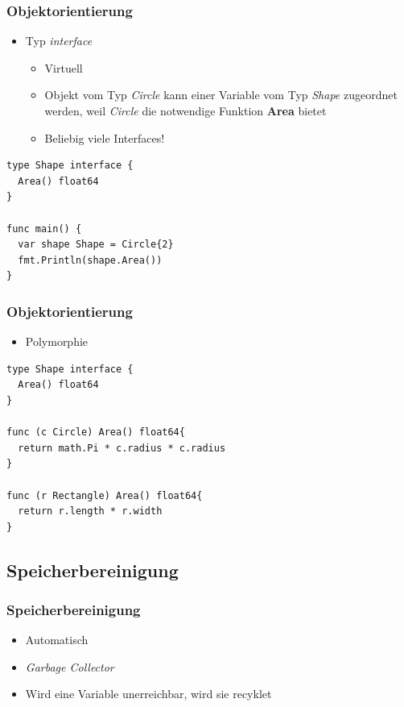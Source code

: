 \documentclass{beamer}
\begin{document}
\begin{frame}[fragile]
\frametitle{Objektorientierung}

\begin{itemize}
\item Typ \textit{interface}
\begin{itemize}
\setlength{\itemsep}{12pt}
\item Virtuell
\item Objekt vom Typ \textit{Circle} kann einer Variable vom Typ \textit{Shape} zugeordnet werden, weil \textit{Circle} die notwendige Funktion \textbf{Area} bietet
\item Beliebig viele Interfaces!
\end{itemize}
\end{itemize}

\begin{lstlisting}
type Shape interface {
  Area() float64
}

func main() {
  var shape Shape = Circle{2}
  fmt.Println(shape.Area())
}
\end{lstlisting}

\end{frame}

\begin{frame}[fragile]
\frametitle{Objektorientierung}

\begin{itemize}
\item Polymorphie
\end{itemize}

\begin{lstlisting}
type Shape interface {
  Area() float64
}

func (c Circle) Area() float64{
  return math.Pi * c.radius * c.radius
}

func (r Rectangle) Area() float64{
  return r.length * r.width
}
\end{lstlisting}

\end{frame}

\subsection{Speicherbereinigung}
\begin{frame}
\frametitle{Speicherbereinigung}

\begin{itemize}
\setlength{\itemsep}{30pt}
\item Automatisch
\item \textit{Garbage Collector}
\item Wird eine Variable unerreichbar, wird sie recyklet
\end{itemize}

\end{frame}
\end{document}
